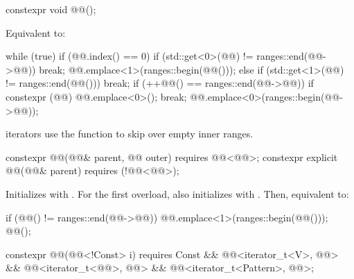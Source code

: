 \begin{itemdecl}
constexpr void @@();
\end{itemdecl}

\begin{itemdescr}
\pnum
\effects
Equivalent to:
\begin{codeblock}
while (true) {
  if (@@.index() == 0) {
    if (std::get<0>(@@) != ranges::end(@@->@@))
      break;
    @@.emplace<1>(ranges::begin(@@()));
  } else {
    if (std::get<1>(@@) != ranges::end(@@()))
      break;
    if (++@@() == ranges::end(@@->@@)) {
      if constexpr (@@)
        @@.emplace<0>();
      break;
    }
    @@.emplace<0>(ranges::begin(@@->@@));
  }
}
\end{codeblock}

\begin{note}
 iterators use the  function
to skip over empty inner ranges.
\end{note}
\end{itemdescr}

\begin{itemdecl}
constexpr @@(@@& parent, @@ outer)
  requires @@<@@>;
constexpr explicit @@(@@& parent)
  requires (!@@<@@>);
\end{itemdecl}

\begin{itemdescr}
\pnum
\effects
Initializes  with .
For the first overload, also initializes
 with .
Then, equivalent to:
\begin{codeblock}
if (@@() != ranges::end(@@->@@)) {
  @@.emplace<1>(ranges::begin(@@()));
  @@();
}
\end{codeblock}
\end{itemdescr}

\begin{itemdecl}
constexpr @@(@@<!Const> i)
    requires Const && @@<iterator_t<V>, @@> &&
             @@<iterator_t<@@>, @@> &&
             @@<iterator_t<Pattern>, @@>;
\end{itemdecl}

